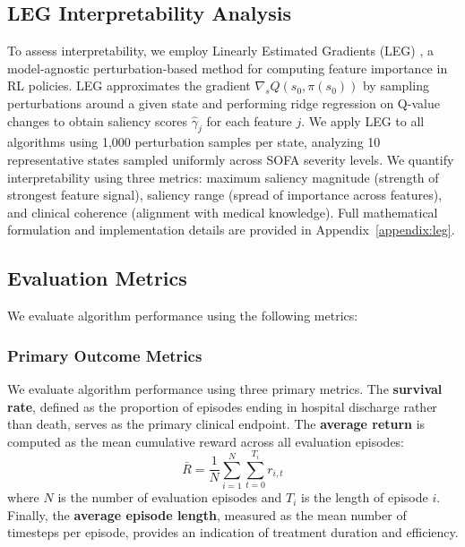\subsection{LEG Interpretability Analysis}\label{sec:methods:leg}

To assess interpretability, we employ Linearly Estimated Gradients (LEG) \citep{greydanus2018leg}, a model-agnostic perturbation-based method for computing feature importance in RL policies. LEG approximates the gradient $\nabla_s Q(s_0, \pi(s_0))$ by sampling perturbations around a given state and performing ridge regression on Q-value changes to obtain saliency scores $\hat{\gamma}_j$ for each feature $j$. We apply LEG to all algorithms using 1,000 perturbation samples per state, analyzing 10 representative states sampled uniformly across SOFA severity levels. We quantify interpretability using three metrics: maximum saliency magnitude (strength of strongest feature signal), saliency range (spread of importance across features), and clinical coherence (alignment with medical knowledge). Full mathematical formulation and implementation details are provided in Appendix~\ref{appendix:leg}.

\subsection{Evaluation Metrics}\label{sec:methods:eval}

We evaluate algorithm performance using the following metrics:

\subsubsection{Primary Outcome Metrics}

We evaluate algorithm performance using three primary metrics. The \textbf{survival rate}, defined as the proportion of episodes ending in hospital discharge rather than death, serves as the primary clinical endpoint. The \textbf{average return} is computed as the mean cumulative reward across all evaluation episodes:
\begin{equation}
\bar{R} = \frac{1}{N} \sum_{i=1}^N \sum_{t=0}^{T_i} r_{i,t}
\end{equation}
where $N$ is the number of evaluation episodes and $T_i$ is the length of episode $i$. Finally, the \textbf{average episode length}, measured as the mean number of timesteps per episode, provides an indication of treatment duration and efficiency.

